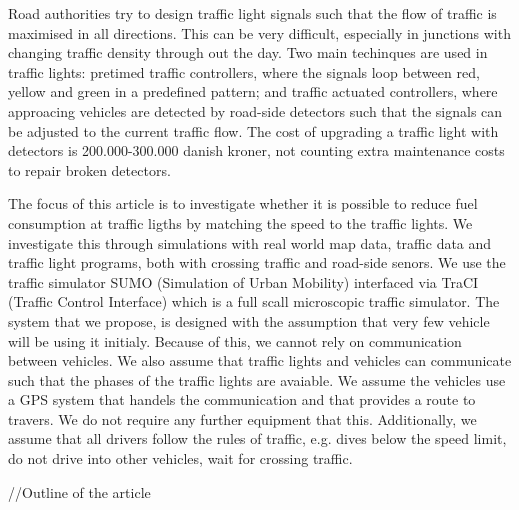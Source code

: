 Road authorities try to design traffic light signals such that the flow of traffic is maximised in all directions.
This can be very difficult, especially in junctions with changing traffic density through out the day.
Two main techinques are used in traffic lights: pretimed traffic controllers, where the signals loop between red, yellow and green in a predefined pattern; and traffic actuated controllers, where approacing vehicles are detected by road-side detectors such that the signals can be adjusted to the current traffic flow. 
The cost of upgrading a traffic light with detectors is 200.000-300.000 danish kroner, not counting extra maintenance costs to repair broken detectors\cite{Vejdir}.

The focus of this article is to investigate whether it is possible to reduce fuel consumption at traffic ligths by matching the speed to the traffic lights. 
We investigate this through simulations with real world map data, traffic data and traffic light programs, both with crossing traffic and road-side senors. %
We use the traffic simulator SUMO (Simulation of Urban Mobility)\cite{sumo} interfaced via TraCI (Traffic Control Interface)\cite{traci} which is a full scall microscopic traffic simulator.
The system that we propose, is designed with the assumption that very few vehicle will be using it initialy. 
Because of this, we cannot rely on communication between vehicles.
We also assume that traffic lights and vehicles can communicate such that the phases of the traffic lights are avaiable.
We assume the vehicles use a GPS system that handels the communication and that provides a route to travers.
We do not require any further equipment that this.
Additionally, we assume that all drivers follow the rules of traffic, e.g. dives below the speed limit, do not drive into other vehicles, wait for crossing traffic.

//Outline of the article












